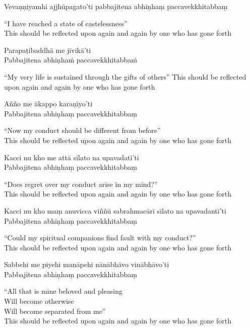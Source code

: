 Vevaṇṇiyamhi ajjhūpagato'ti pabbajitena abhiṇhaṃ paccavekkhitabbaṃ

\begin{english}
  “I have reached a state of castelessness”\\
  This should be reflected upon again and again by one who has gone forth
\end{english}

Parapaṭibaddhā me jīvikā’ti\\
Pabbajitena abhiṇhaṁ paccavekkhitabbaṁ

\begin{english}
  “My very life is sustained through the gifts of others”
  This should be reflected upon again and again by one who has gone forth
\end{english}

Añño me ākappo karaṇīyo'ti\\
Pabbajitena abhiṇhaṃ paccavekkhitabbaṃ

\begin{english}
  “Now my conduct should be different from before”\\
  This should be reflected upon again and again by one who has gone forth
\end{english}

Kacci nu kho me attā sīlato na upavadatī'ti\\
Pabbajitena abhiṇhaṃ paccavekkhitabbaṃ

\begin{english}
  “Does regret over my conduct arise in my mind?”\\
  This should be reflected upon again and again by one who has gone forth
\end{english}

Kacci nu kho maṃ anuvicca viññū sabrahmacārī sīlato na upavadantī'ti\\
Pabbajitena abhiṇhaṃ paccavekkhitabbaṃ

\begin{english}
  “Could my spiritual companions find fault with my conduct?”\\
  This should be reflected upon again and again by one who has gone forth
\end{english}

Sabbehi me piyehi manāpehi nānābhāvo vinābhāvo'ti\\
Pabbajitena abhiṇhaṃ paccavekkhitabbaṃ

\begin{english}
  “All that is mine beloved and pleasing\\
  Will become otherwise\\
  Will become separated from me”\\
  This should be reflected upon again and again by one who has gone forth
\end{english}

